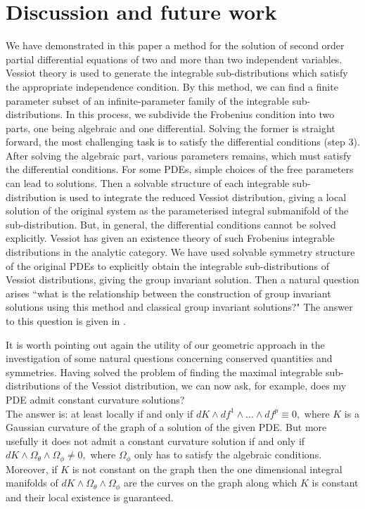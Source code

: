 \documentclass[a4paper, 11pt]{amsart}
\theoremstyle{definition}
\begin{document}
\section{Discussion and future work}
We have demonstrated in this paper a method for the solution of second order partial differential equations of two and more than two independent variables. Vessiot theory is used to generate the integrable sub-distributions which satisfy the appropriate independence condition. By this method, we can find a finite parameter subset of an infinite-parameter family of the integrable sub-distributions. In this process, we subdivide the Frobenius condition into two parts, one being algebraic and one differential. Solving the former is straight forward, the most challenging task is to satisfy the differential conditions (step $3$). After solving the algebraic part, various parameters remains, which must satisfy the differential conditions. For some PDEs, simple choices of the free parameters can lead to solutions. Then a solvable structure of each integrable sub-distribution is used to integrate the reduced Vessiot distribution, giving a local solution of the original system as the parameterised integral submanifold of the sub-distribution. But, in general, the differential conditions cannot be solved explicitly. Vessiot has given an existence theory \cite{Vessiot1924} of such Frobenius integrable distributions in the analytic category. We have used solvable symmetry structure of the original PDEs to explicitly obtain the integrable sub-distributions of Vessiot distributions, giving the group invariant solution.  Then a natural question arises ``what is the relationship between the construction of group invariant solutions using this method and classical group invariant solutions?" The answer to this question is given in  \cite[\S VI]{sherr}.

It is worth pointing out again the utility of our geometric approach in the investigation of some natural questions concerning conserved quantities and symmetries. Having solved the problem of finding the maximal integrable sub-distributions of the Vessiot distribution, we can now ask, for example, does my PDE admit constant curvature solutions?\\
The answer is: at least locally if and only if $dK\wedge df^1\wedge\ldots\wedge df^p\equiv0,$  where $K$ is a Gaussian curvature of the graph of a solution of the given PDE.
But more usefully it does not admit a constant curvature solution if and only if
$dK\wedge \Omega_{\theta}\wedge \Omega_{\phi}\neq 0,$ where $\Omega_\phi$ only has to satisfy the algebraic conditions.
Moreover, if $K$ is not constant on the graph then the one dimensional integral manifolds of $dK\wedge \Omega_{\theta}\wedge \Omega_{\phi}$ are the curves on the graph along which $K$ is constant and their local existence is guaranteed.
\end{document}
